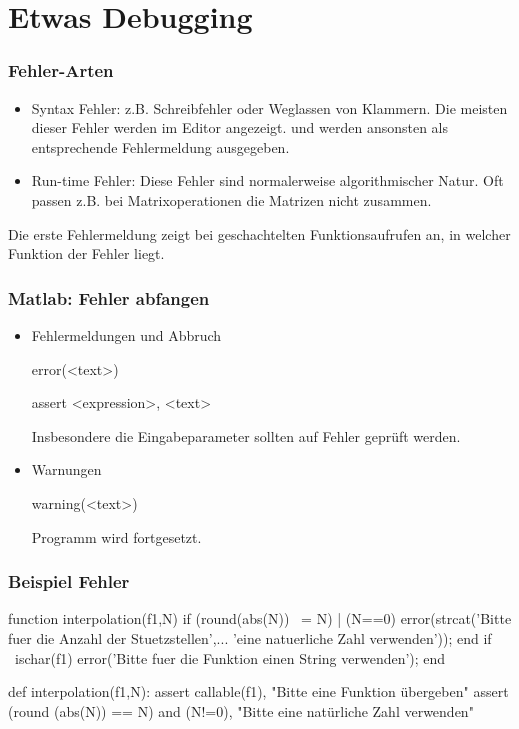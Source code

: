 \documentclass[hyperref={xetex}]{beamer}
\begin{document}
\section{Etwas Debugging}
%
%
\begin{frame}[fragile]\frametitle{Fehler-Arten}
\begin{itemize}
\item \alert{ Syntax Fehler}: z.B. Schreibfehler oder
  Weglassen von Klammern. Die meisten dieser Fehler werden im Editor angezeigt. 
  und werden ansonsten als entsprechende Fehlermeldung ausgegeben. 
\item \alert{ Run-time Fehler}: Diese Fehler sind
  normalerweise algorithmischer Natur. Oft passen z.B. bei
  Matrixoperationen die Matrizen nicht zusammen.
\end{itemize}

\scriptsize{ Die erste Fehlermeldung zeigt bei geschachtelten Funktionsaufrufen
an, in welcher Funktion der Fehler liegt.}
\end{frame}
%
%
\begin{frame}[fragile]\frametitle{Matlab: Fehler abfangen}
\begin{itemize}
\item \alert{Fehlermeldungen und Abbruch}
\begin{matlabin}
error(<text>) 
\end{matlabin}
\begin{pyin}
assert <expression>, <text>  
\end{pyin}
Insbesondere die Eingabeparameter sollten auf Fehler geprüft werden.
\item \alert{Warnungen}
\begin{matlabin}
warning(<text>)
\end{matlabin}
Programm wird fortgesetzt.
\end{itemize}
\end{frame}
%
%
\begin{frame}[fragile]\frametitle{Beispiel Fehler}
\begin{matlabin}
function interpolation(f1,N)
if (round(abs(N)) ~= N) | (N==0)
    error(strcat('Bitte fuer die Anzahl der Stuetzstellen',...
    'eine natuerliche Zahl verwenden'));
end
if ~ischar(f1)
    error('Bitte fuer die Funktion einen String verwenden');
end
\end{matlabin}
  \begin{pyin}
def interpolation(f1,N):
    assert callable(f1), "Bitte eine Funktion übergeben"
    assert (round (abs(N)) == N) and (N!=0), "Bitte eine natürliche Zahl verwenden"
  \end{pyin}
\end{frame}
\end{document}
